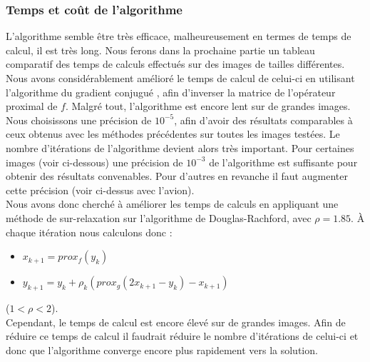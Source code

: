 \subsubsection{Temps et coût de l'algorithme}
L'algorithme semble être très efficace, malheureusement en termes de temps de calcul, il est très long. Nous ferons dans la prochaine partie un tableau comparatif des temps de calculs effectués sur des images de tailles différentes.\\
Nous avons considérablement amélioré le temps de calcul de celui-ci en utilisant l'algorithme du gradient conjugué \cite{Gradient}, afin d'inverser la matrice de l'opérateur proximal de $f$. Malgré tout, l'algorithme est encore lent sur de grandes images. Nous choisissons une précision de $10^{-5}$, afin d'avoir des résultats comparables à ceux obtenus avec les méthodes précédentes sur toutes les images testées. Le nombre d'itérations de l'algorithme devient alors très important. Pour certaines images (voir ci-dessous) une précision de $10^{-3}$ de l'algorithme est suffisante pour obtenir des résultats convenables. Pour d'autres en revanche il faut augmenter cette précision (voir ci-dessus avec l'avion).\\
Nous avons donc cherché à améliorer les temps de calculs en appliquant une méthode de sur-relaxation sur l'algorithme de Douglas-Rachford, avec $\rho  =1.85$. À chaque itération nous calculons donc :
\begin{center} 
\begin{itemize}
\item $x_{k+1} = prox_f(y_k)$
\item $y_{k+1} = y_k+\rho_k(prox_g(2x_{k+1}-y_k)-x_{k+1})$
\end{itemize}
\end{center}
($1<\rho<2$).\\
Cependant, le temps de calcul est encore élevé sur de grandes images.
Afin de réduire ce temps de calcul il faudrait réduire le nombre d'itérations de celui-ci et donc que l'algorithme converge encore plus rapidement vers la solution. 
